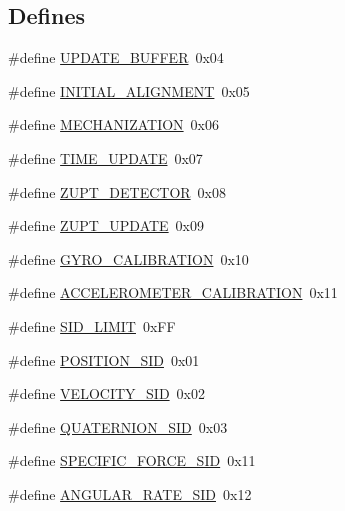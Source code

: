 \subsection*{\-Defines}
\begin{DoxyCompactItemize}
\item 
\#define \hyperlink{group__tables_gac644d2e05254dadd0b19a93c12c0afd9}{\-U\-P\-D\-A\-T\-E\-\_\-\-B\-U\-F\-F\-E\-R}~0x04
\item 
\#define \hyperlink{group__tables_ga88f8e60882c5d69d913d1b616687465d}{\-I\-N\-I\-T\-I\-A\-L\-\_\-\-A\-L\-I\-G\-N\-M\-E\-N\-T}~0x05
\item 
\#define \hyperlink{group__tables_gaec182aad2e49484d086d38c7ed1f9fe4}{\-M\-E\-C\-H\-A\-N\-I\-Z\-A\-T\-I\-O\-N}~0x06
\item 
\#define \hyperlink{group__tables_ga72e2455cf02251f80606a36183764cd1}{\-T\-I\-M\-E\-\_\-\-U\-P\-D\-A\-T\-E}~0x07
\item 
\#define \hyperlink{group__tables_ga2ea883c0ff4e6a5d37f32290ab3524b7}{\-Z\-U\-P\-T\-\_\-\-D\-E\-T\-E\-C\-T\-O\-R}~0x08
\item 
\#define \hyperlink{group__tables_ga7d004ff741f1e7caad510eaa0a548fc1}{\-Z\-U\-P\-T\-\_\-\-U\-P\-D\-A\-T\-E}~0x09
\item 
\#define \hyperlink{group__tables_ga5f00f42fc2574820abde7c7dd797a036}{\-G\-Y\-R\-O\-\_\-\-C\-A\-L\-I\-B\-R\-A\-T\-I\-O\-N}~0x10
\item 
\#define \hyperlink{group__tables_ga8b4361d794c38610770d0078d5a581f3}{\-A\-C\-C\-E\-L\-E\-R\-O\-M\-E\-T\-E\-R\-\_\-\-C\-A\-L\-I\-B\-R\-A\-T\-I\-O\-N}~0x11
\item 
\#define \hyperlink{group__tables_gaeadb9947c80d097da4413c55179afe6f}{\-S\-I\-D\-\_\-\-L\-I\-M\-I\-T}~0x\-F\-F
\item 
\#define \hyperlink{group__tables_gaafd3e23709eecfd5bfdc358f8a07b991}{\-P\-O\-S\-I\-T\-I\-O\-N\-\_\-\-S\-I\-D}~0x01
\item 
\#define \hyperlink{group__tables_ga6b3256a3e116aaefe13352f9b493c279}{\-V\-E\-L\-O\-C\-I\-T\-Y\-\_\-\-S\-I\-D}~0x02
\item 
\#define \hyperlink{group__tables_gae1fc29b0358f36a68b7ba9bde85e16fd}{\-Q\-U\-A\-T\-E\-R\-N\-I\-O\-N\-\_\-\-S\-I\-D}~0x03
\item 
\#define \hyperlink{group__tables_gae04e393e8b250dad55fddb546ef61111}{\-S\-P\-E\-C\-I\-F\-I\-C\-\_\-\-F\-O\-R\-C\-E\-\_\-\-S\-I\-D}~0x11
\item 
\#define \hyperlink{group__tables_ga4bae6e7de487043575d61cb52dff4cf3}{\-A\-N\-G\-U\-L\-A\-R\-\_\-\-R\-A\-T\-E\-\_\-\-S\-I\-D}~0x12

\end{DoxyCompactItemize}
